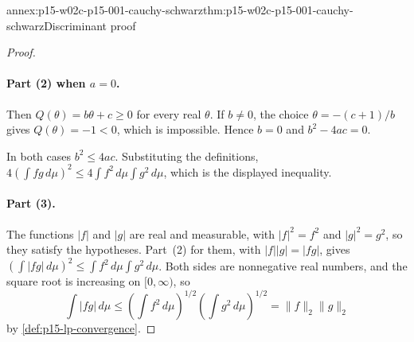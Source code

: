 \begin{annexitem}{annex:p15-w02c-p15-001-cauchy-schwarz}{thm:p15-w02c-p15-001-cauchy-schwarz}{Discriminant proof}
\begin{proof}
\paragraph{Part (2) when \(a=0\).}
Then \(Q(\theta)=b\theta+c\geq0\) for every real \(\theta\). If
\(b\neq0\), the choice \(\theta=-(c+1)/b\) gives \(Q(\theta)=-1<0\),
which is impossible. Hence \(b=0\) and \(b^2-4ac=0\).

In both cases \(b^2\leq4ac\). Substituting the definitions,
\(4\left(\int fg\,d\mu\right)^2\leq4\int f^2\,d\mu\int g^2\,d\mu\), which
is the displayed inequality.

\paragraph{Part (3).}
The functions \(|f|\) and \(|g|\) are real and measurable, with
\(|f|^2=f^2\) and \(|g|^2=g^2\), so they satisfy the hypotheses. Part~(2)
for them, with \(|f||g|=|fg|\), gives
\(\left(\int|fg|\,d\mu\right)^2\leq\int f^2\,d\mu\int g^2\,d\mu\). Both
sides are nonnegative real numbers, and the square root is increasing on
\([0,\infty)\), so
\[
 \int|fg|\,d\mu\leq\left(\int f^2\,d\mu\right)^{1/2}
 \left(\int g^2\,d\mu\right)^{1/2}=\|f\|_2\|g\|_2
\]
by \cref{def:p15-lp-convergence}.
\end{proof}
\end{annexitem}

